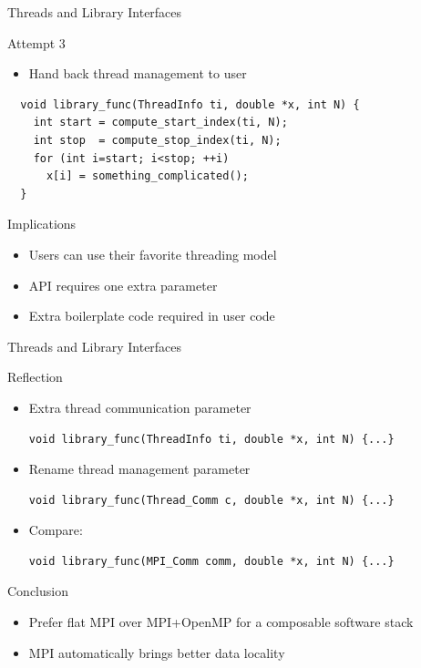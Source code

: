 \begin{frame}[fragile]{Threads and Library Interfaces}

 \begin{block}{Attempt 3}
  \begin{itemize}
   \item Hand back thread management to user
  \end{itemize}
 \end{block}

  \begin{lstlisting}
  void library_func(ThreadInfo ti, double *x, int N) {
    int start = compute_start_index(ti, N);
    int stop  = compute_stop_index(ti, N);
    for (int i=start; i<stop; ++i)
      x[i] = something_complicated();
  }
  \end{lstlisting}

  \begin{block}{Implications}
   \begin{itemize}
    \item Users can use their favorite threading model
    \item API requires one extra parameter
    \item Extra boilerplate code required in user code
  \end{itemize}
 \end{block}

\end{frame}


\begin{frame}[fragile]{Threads and Library Interfaces}

 \begin{block}{Reflection}
  \begin{itemize}
   \item Extra thread communication parameter
    \begin{lstlisting}
void library_func(ThreadInfo ti, double *x, int N) {...}
    \end{lstlisting}
   \item Rename thread management parameter
    \begin{lstlisting}
void library_func(Thread_Comm c, double *x, int N) {...}
    \end{lstlisting}
   \item Compare:
    \begin{lstlisting}
void library_func(MPI_Comm comm, double *x, int N) {...}
    \end{lstlisting}
  \end{itemize}
 \end{block}

  \begin{block}{Conclusion}
   \begin{itemize}
    \item Prefer flat MPI over MPI+OpenMP for a composable software stack
    \item MPI automatically brings better data locality
  \end{itemize}
 \end{block}

\end{frame}
